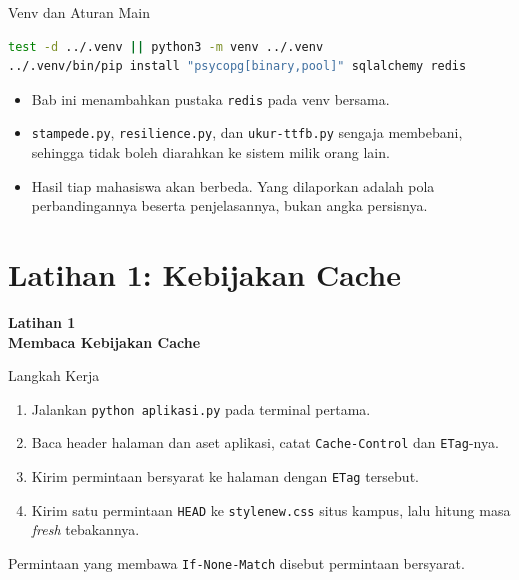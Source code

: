 \documentclass[aspectratio=169, table, 12pt]{beamer}
\begin{document}
\begin{frame}[fragile]{{\Large Venv dan Aturan Main}}
  \vspace{2pt}
\begin{lstlisting}[language=bash]
test -d ../.venv || python3 -m venv ../.venv
../.venv/bin/pip install "psycopg[binary,pool]" sqlalchemy redis
\end{lstlisting}

  \vspace{4pt}
  \begin{itemize}
    \item Bab ini menambahkan pustaka \texttt{redis} pada venv bersama.
    \item \texttt{stampede.py}, \texttt{resilience.py}, dan
          \texttt{ukur-ttfb.py} sengaja membebani, sehingga tidak boleh
          diarahkan ke sistem milik orang lain.
    \item Hasil tiap mahasiswa akan berbeda. Yang dilaporkan adalah pola
          perbandingannya beserta penjelasannya, bukan angka persisnya.
  \end{itemize}
\end{frame}

\section{Latihan 1: Kebijakan Cache}

\begin{frame}{\hfill}
  \centering
  \Huge{\textbf{Latihan 1\\Membaca Kebijakan Cache}}
\end{frame}

\begin{frame}{{\Large Langkah Kerja}}
  \vspace{2pt}
  {\small
  \begin{enumerate}
    \item Jalankan \texttt{python aplikasi.py} pada terminal pertama.
    \item Baca header halaman dan aset aplikasi, catat \texttt{Cache-Control}
          dan \texttt{ETag}-nya.
    \item Kirim permintaan bersyarat ke halaman dengan \texttt{ETag} tersebut.
    \item Kirim satu permintaan \texttt{HEAD} ke \texttt{stylenew.css} situs
          kampus, lalu hitung masa \textit{fresh} tebakannya.
  \end{enumerate}}
  \vspace{4pt}
  {\footnotesize Permintaan yang membawa \texttt{If-None-Match} disebut
  permintaan bersyarat.}
\end{frame}
\end{document}
